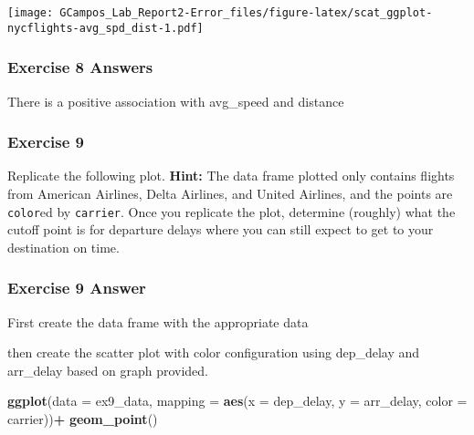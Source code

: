 \documentclass[
]{article}
\newenvironment{Shaded}{\begin{snugshade}}{\end{snugshade}}
\newcommand{\DataTypeTok}[1]{\textcolor[rgb]{0.13,0.29,0.53}{#1}}
\newcommand{\KeywordTok}[1]{\textcolor[rgb]{0.13,0.29,0.53}{\textbf{#1}}}
\newcommand{\NormalTok}[1]{#1}
\newcommand{\OperatorTok}[1]{\textcolor[rgb]{0.81,0.36,0.00}{\textbf{#1}}}
\newcommand{\StringTok}[1]{\textcolor[rgb]{0.31,0.60,0.02}{#1}}
\begin{document}
\texttt{[image: GCampos\_Lab\_Report2-Error\_files/figure-latex/scat\_ggplot-nycflights-avg\_spd\_dist-1.pdf]}

\hypertarget{exercise-8-answers}{%
\subsubsection{\texorpdfstring{\textbf{Exercise 8
Answers}}{Exercise 8 Answers}}\label{exercise-8-answers}}

There is a positive association with avg\_speed and distance

\hypertarget{exercise-9}{%
\subsubsection{Exercise 9}\label{exercise-9}}

Replicate the following plot. \textbf{Hint:} The data frame plotted only
contains flights from American Airlines, Delta Airlines, and United
Airlines, and the points are \texttt{color}ed by \texttt{carrier}. Once
you replicate the plot, determine (roughly) what the cutoff point is for
departure delays where you can still expect to get to your destination
on time.

\hypertarget{exercise-9-answer}{%
\subsubsection{\texorpdfstring{\textbf{Exercise 9
Answer}}{Exercise 9 Answer}}\label{exercise-9-answer}}

First create the data frame with the appropriate data

\begin{Shaded}
\end{Shaded}

then create the scatter plot with color configuration using dep\_delay
and arr\_delay based on graph provided.

\begin{Shaded}
\begin{Highlighting}[]
\KeywordTok{ggplot}\NormalTok{(}\DataTypeTok{data  =}\NormalTok{ ex9_data, }\DataTypeTok{mapping =} \KeywordTok{aes}\NormalTok{(}\DataTypeTok{x =}\NormalTok{ dep_delay, }\DataTypeTok{y =}\NormalTok{ arr_delay, }\DataTypeTok{color =}\NormalTok{ carrier))}\OperatorTok{+}\StringTok{ }\KeywordTok{geom_point}\NormalTok{()}
\end{Highlighting}
\end{Shaded}
\end{document}
